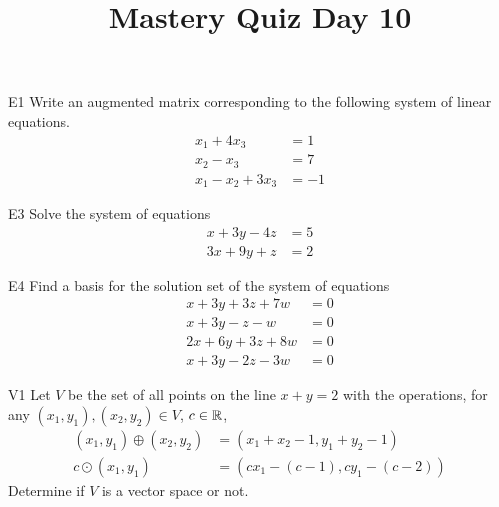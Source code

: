 \documentclass{sbgLAquiz}
\title{Mastery Quiz Day 10 }
\begin{document}
\begin{problem}{E1}
Write an augmented matrix corresponding to the following system of linear equations.
\begin{align*}
x_1+4x_3 &= 1 \\
x_2-x_3 &= 7 \\
x_1-x_2+3x_3 &= -1
\end{align*}
\end{problem}

\begin{problem}{E3}
Solve the system of equations
\begin{align*}
x+3y-4z &= 5 \\
3x+9y+z &= 2
\end{align*}
\end{problem}
\newpage

\begin{problem}{E4}
Find a basis for the solution set of the system of equations
\begin{align*}
x+3y+3z+7w &= 0 \\
 x+3y-z-w &= 0 \\
  2x+6y+3z+8w &= 0 \\
   x+3y-2z-3w &= 0
\end{align*}
\end{problem}

\begin{problem}{V1}
Let $V$ be the set of all points on the line $x+y=2$ with the operations, for any $(x_1,y_1), (x_2,y_2) \in V$, $c \in \mathbb{R}$,
\begin{align*}
(x_1,y_1) \oplus (x_2,y_2) &= (x_1+x_2-1,y_1+y_2-1) \\
c \odot (x_1,y_1) &= (cx_1-(c-1), cy_1-(c-2))
\end{align*}
Determine if $V$ is a vector space or not.
\end{problem}
\end{document}

